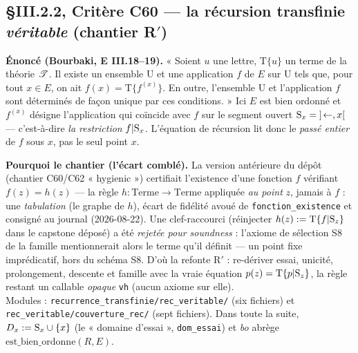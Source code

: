 
\subsection{§III.2.2, Critère C60 --- la récursion transfinie \emph{véritable} (chantier R$'$)}

\textbf{Énoncé (Bourbaki, E III.18--19).} « Soient $u$ une lettre, $\mathrm{T}\{u\}$
un terme de la théorie $\mathscr{T}$. Il existe un ensemble $\mathrm{U}$ et une application
$f$ de $E$ sur $\mathrm{U}$ tels que, pour tout $x \in E$, on ait
$f(x) = \mathrm{T}\{f^{(x)}\}$. En outre, l'ensemble $\mathrm{U}$ et l'application
$f$ sont déterminés de façon unique par ces conditions. » Ici $E$ est bien ordonné
et $f^{(x)}$ désigne l'application qui coïncide avec $f$ sur le segment ouvert
$\mathrm{S}_x = {]\!\leftarrow, x[}$ --- c'est-à-dire \emph{la restriction} $f|\mathrm{S}_x$.
L'équation de récursion lit donc le \emph{passé entier} de $f$ sous $x$, pas le
seul point $x$.

\textbf{Pourquoi le chantier (l'écart comblé).} La version antérieure du dépôt
(chantier C60/C62 « hygienic ») certifiait l'existence d'une fonction $f$
vérifiant $f(z) = h(z)$ --- la règle $h : \text{Terme}\to\text{Terme}$ appliquée
\emph{au point} $z$, jamais à $f$ : une \emph{tabulation} (le graphe de $h$),
écart de fidélité avoué de \texttt{fonction\_existence} et consigné au journal
(2026-08-22). Une clef-raccourci (réinjecter $h(z) := \mathrm{T}\{f|\mathrm{S}_z\}$
dans le capstone déposé) a été \emph{rejetée pour soundness} : l'axiome de
sélection S8 de la famille mentionnerait alors le terme qu'il définit --- un
point fixe imprédicatif, hors du schéma S8. D'où la refonte R$'$ : re-dériver
essai, unicité, prolongement, descente et famille avec la vraie équation
$p(z) = \mathrm{T}\{p|\mathrm{S}_z\}$, la règle restant un callable \emph{opaque}
\texttt{vh} (aucun axiome sur elle). \\
Modules : \texttt{recurrence\_transfinie/rec\_veritable/} (six fichiers) et
\texttt{rec\_veritable/couverture\_rec/} (sept fichiers). Dans toute la suite,
$D_x := \mathrm{S}_x \cup \{x\}$ (le « domaine d'essai », \texttt{dom\_essai}) et
\emph{bo} abrège $\mathrm{est\_bien\_ordonne}(R, E)$.


